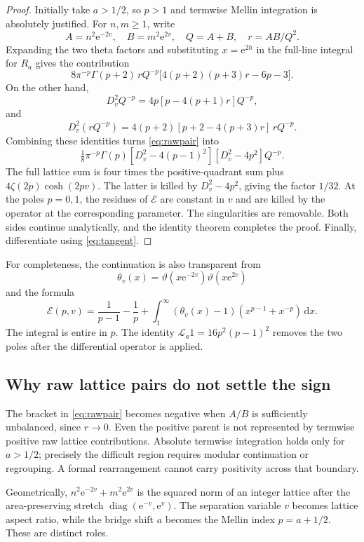 \documentclass[11pt,letterpaper]{article}
\numberwithin{equation}{section}
\theoremstyle{remark}\newtheorem{remark}[proposition]{Remark}
\newcommand{\dd}{\,\mathrm d}
\newcommand{\calE}{\mathcal E}
\newcommand{\ee}{\mathrm e}
\begin{document}
\begin{proof}
Initially take $a>1/2$, so $p>1$ and termwise Mellin integration is absolutely justified. For $n,m\ge1$, write
\[
 A=n^2\ee^{-2v},\quad B=m^2\ee^{2v},\quad Q=A+B,\quad r=AB/Q^2.
\]
Expanding the two theta factors and substituting $x=\ee^{2h}$ in the full-line integral for $R_a$ gives the contribution
\begin{equation}\label{eq:rawpair}
 8\pi^{-p}\Gamma(p+2)\,rQ^{-p}
       \bigl[4(p+2)(p+3)r-6p-3\bigr].
\end{equation}
On the other hand,
\[
 D_v^2Q^{-p}=4p[p-4(p+1)r]Q^{-p},
\]
and
\[
 D_v^2(rQ^{-p})=4(p+2)[p+2-4(p+3)r]\,rQ^{-p}.
\]
Combining these identities turns \eqref{eq:rawpair} into
\[
 \tfrac18\pi^{-p}\Gamma(p)
 [D_v^2-4(p-1)^2][D_v^2-4p^2]Q^{-p}.
\]
The full lattice sum is four times the positive-quadrant sum plus
$4\zeta(2p)\cosh(2pv)$. The latter is killed by $D_v^2-4p^2$, giving the factor $1/32$. At the poles $p=0,1$, the residues of $\calE$ are constant in $v$ and are killed by the operator at the corresponding parameter. The singularities are removable. Both sides continue analytically, and the identity theorem completes the proof. Finally, differentiate using \eqref{eq:tangent}.
\end{proof}

For completeness, the continuation is also transparent from
\[
 \theta_v(x)=\vartheta(x\ee^{-2v})\vartheta(x\ee^{2v})
\]
and the formula
\begin{equation}
 \calE(p,v)=\frac1{p-1}-\frac1p+
 \int_1^\infty(\theta_v(x)-1)(x^{p-1}+x^{-p})\dd x.
\end{equation}
The integral is entire in $p$. The identity
$\mathcal L_a1=16p^2(p-1)^2$ removes the two poles after the differential operator is applied.

\subsection{Why raw lattice pairs do not settle the sign}
The bracket in \eqref{eq:rawpair} becomes negative when $A/B$ is sufficiently unbalanced, since $r\to0$. Even the positive parent is not represented by termwise positive raw lattice contributions. Absolute termwise integration holds only for $a>1/2$; precisely the difficult region requires modular continuation or regrouping. A formal rearrangement cannot carry positivity across that boundary.

Geometrically, $n^2\ee^{-2v}+m^2\ee^{2v}$ is the squared norm of an integer lattice after the area-preserving stretch $\operatorname{diag}(\ee^{-v},\ee^v)$. The separation variable $v$ becomes lattice aspect ratio, while the bridge shift $a$ becomes the Mellin index $p=a+1/2$. These are distinct roles.
\end{document}
